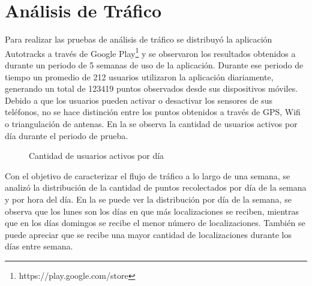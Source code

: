 \section{Análisis de Tráfico}

Para realizar las pruebas de análisis de tráfico se distribuyó la aplicación Autotracks a través de Google Play\footnote{https://play.google.com/store} y se observaron los resultados obtenidos a durante un periodo de 5 semanas de uso de la aplicación. Durante ese periodo de tiempo un promedio de 212 usuarios utilizaron la aplicación diariamente, generando un total de 123419 puntos observados desde sus dispositivos móviles. Debido a que los usuarios pueden activar o desactivar los sensores de sus teléfonos, no se hace distinción entre los puntos obtenidos a través de GPS, Wifi o triangulación de antenas. En la  se observa la cantidad de usuarios activos por día durante el periodo de prueba.

\begin{figure}[h]
	\centering
	\caption{Cantidad de usuarios activos por día}
	\label{fig:cantidad_usuarios}
\end{figure}

Con el objetivo de caracterizar el flujo de tráfico a lo largo de una semana, se analizó la distribución de la cantidad de puntos recolectados por día de la semana y por hora del día. En la  se puede ver la distribución por día de la semana, se observa que los lunes son los días en que más localizaciones se reciben, mientras que en los días domingos se recibe el menor número de localizaciones. También se puede apreciar que se recibe una mayor cantidad de localizaciones durante los días entre semana.

